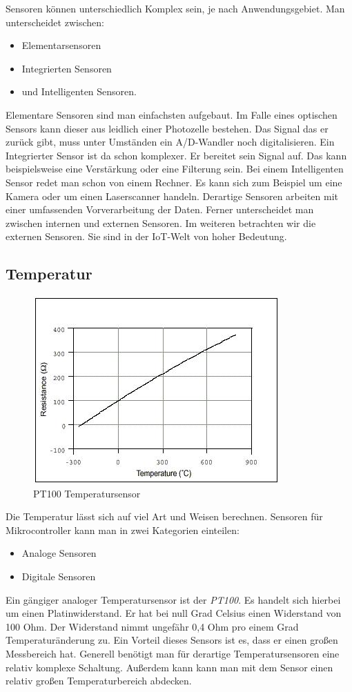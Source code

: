 Sensoren können unterschiedlich Komplex sein, je nach Anwendungsgebiet. Man unterscheidet zwischen:
\begin{itemize}
\item Elementarsensoren
\item Integrierten Sensoren
\item und Intelligenten Sensoren.
\end{itemize}

Elementare Sensoren sind man einfachsten aufgebaut. Im Falle eines optischen Sensors kann dieser aus leidlich einer Photozelle bestehen. Das Signal das er zurück gibt, muss unter Umständen ein A/D-Wandler noch digitalisieren. 
Ein Integrierter Sensor ist da schon komplexer. Er bereitet sein Signal auf. Das kann beispielsweise eine Verstärkung oder eine Filterung sein. Bei einem Intelligenten Sensor redet man schon von einem Rechner. Es kann sich zum Beispiel um eine Kamera oder um einen Laserscanner handeln. Derartige Sensoren arbeiten mit einer umfassenden Vorverarbeitung der Daten. 
Ferner unterscheidet man zwischen internen und externen Sensoren. Im weiteren betrachten wir die externen Sensoren. Sie sind in der IoT-Welt von hoher Bedeutung.
\cite{strand}
\subsection{Temperatur}
\begin{figure}
\includegraphics[scale=1]{bilder/pt100} 
\caption{PT100 Temperatursensor \cite{PT100} }
\label{PT100}
\end{figure}
Die Temperatur lässt sich auf viel Art und Weisen berechnen. Sensoren für Mikrocontroller kann man in zwei Kategorien einteilen:
\begin{itemize}
\item Analoge Sensoren
\item Digitale Sensoren
\end{itemize}
Ein gängiger analoger Temperatursensor ist der \textit{PT100}. Es handelt sich hierbei um einen Platinwiderstand. Er hat bei null Grad Celsius einen Widerstand von 100 Ohm. Der Widerstand nimmt ungefähr 0,4 Ohm pro einem Grad Temperaturänderung zu. Ein Vorteil dieses Sensors ist es, dass er einen großen Messbereich hat. Generell benötigt man für derartige Temperatursensoren eine relativ komplexe Schaltung. Außerdem kann kann man mit dem Sensor einen relativ großen Temperaturbereich abdecken.

